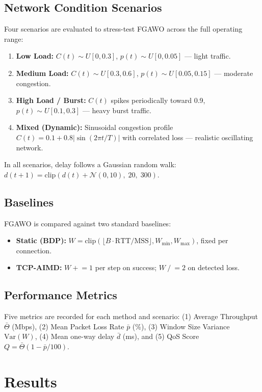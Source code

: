 \documentclass[10pt, twocolumn]{IEEEtran}
\theoremstyle{definition}
\begin{document}
\subsection{Network Condition Scenarios}

Four scenarios are evaluated to stress-test FGAWO across the full operating range:
\begin{enumerate}
  \item \textbf{Low Load:} $C(t) \sim U[0, 0.3]$, $p(t) \sim U[0, 0.05]$ — light traffic.
  \item \textbf{Medium Load:} $C(t) \sim U[0.3, 0.6]$, $p(t) \sim U[0.05, 0.15]$ — moderate congestion.
  \item \textbf{High Load / Burst:} $C(t)$ spikes periodically toward 0.9, $p(t) \sim U[0.1, 0.3]$ — heavy burst traffic.
  \item \textbf{Mixed (Dynamic):} Sinusoidal congestion profile $C(t) = 0.1 + 0.8|\sin(2\pi t/T)|$ with correlated loss — realistic oscillating network.
\end{enumerate}
In all scenarios, delay follows a Gaussian random walk: $d(t{+}1) = \text{clip}(d(t) + \mathcal{N}(0,10),\; 20,\; 300)$.

\subsection{Baselines}

FGAWO is compared against two standard baselines:
\begin{itemize}
  \item \textbf{Static (BDP):} $W = \text{clip}(\lfloor B \cdot \text{RTT}/\text{MSS} \rfloor, W_{\min}, W_{\max})$, fixed per connection.
  \item \textbf{TCP-AIMD:} $W \mathrel{+}= 1$ per step on success; $W \mathrel{/}= 2$ on detected loss.
\end{itemize}

\subsection{Performance Metrics}

Five metrics are recorded for each method and scenario:
(1) Average Throughput $\bar{\Theta}$ (Mbps),
(2) Mean Packet Loss Rate $\bar{p}$ (\%),
(3) Window Size Variance $\text{Var}(W)$,
(4) Mean one-way delay $\bar{d}$ (ms), and
(5) QoS Score $Q = \bar{\Theta}(1 - \bar{p}/100)$.

\section{Results}
\label{sec:results}
\end{document}
